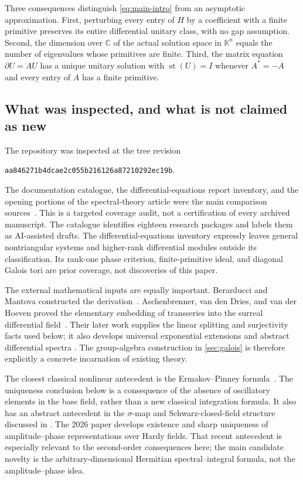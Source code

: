 \documentclass[11pt,a4paper]{article}
\numberwithin{equation}{section}
\theoremstyle{definition}
\theoremstyle{remark}
\newcommand{\K}{\mathbb K}
\newcommand{\C}{\mathbb C}
\newcommand{\st}{\operatorname{st}}
\newcommand{\repocommit}{aa846271b4dcae2c055b216126a87210292ec19b}
\begin{document}
Three consequences distinguish \eqref{eq:main-intro} from an asymptotic
approximation. First, perturbing every entry of $H$ by a coefficient with a
finite primitive preserves its entire differential unitary class, with no
gap assumption. Second, the dimension over $\C$ of the actual solution
space in $\K^n$ equals the number of eigenvalues whose primitives are
finite. Third, the matrix equation $\partial U=AU$ has a unique unitary
solution with $\st(U)=I$ whenever $A^*=-A$ and every entry of $A$ has a
finite primitive.

\subsection{What was inspected, and what is not claimed as new}
The repository was inspected at the tree revision
\begin{center}\small\texttt{\repocommit}.\end{center}
The documentation catalogue, the differential-equations report inventory,
and the opening portions of the spectral-theory article were the main
comparison sources~\cite{RepoMap,RepoDE,RepoSpectral}. This is a targeted
coverage audit, not a certification of every archived manuscript. The
catalogue identifies eighteen research packages and labels them as
AI-assisted drafts. The differential-equations inventory expressly leaves
general nontriangular systems and higher-rank differential modules outside
its classification. Its rank-one phase criterion, finite-primitive ideal,
and diagonal Galois tori are prior coverage, not discoveries of this paper.

The external mathematical inputs are equally important. Berarducci and
Mantova constructed the derivation~\cite{BM}. Aschenbrenner, van den Dries,
and van der Hoeven proved the elementary embedding of transseries into the
surreal differential field~\cite{ADHSur}. Their later work supplies the
linear splitting and surjectivity facts used below; it also develops
universal exponential extensions and abstract differential spectra
\cite{ADHNorm}. The group-algebra construction in \cref{sec:galois} is
therefore explicitly a concrete incarnation of existing theory.

The closest classical nonlinear antecedent is the Ermakov--Pinney
formula~\cite{Pinney}. The uniqueness conclusion below is a consequence of
the absence of oscillatory elements in the base field, rather than a new
classical integration formula. It also has an abstract antecedent in the
$\sigma$-map and Schwarz-closed-field structure discussed in
\cite[Introduction, equations (0.3)--(0.6)]{ADHNorm}.
The 2026 paper \cite{ADHSecond} develops existence and sharp uniqueness
of amplitude--phase representations over Hardy fields. That recent
antecedent is especially relevant to the second-order consequences here;
the main candidate novelty is the arbitrary-dimensional Hermitian
spectral--integral formula, not the amplitude--phase idea.
\end{document}
